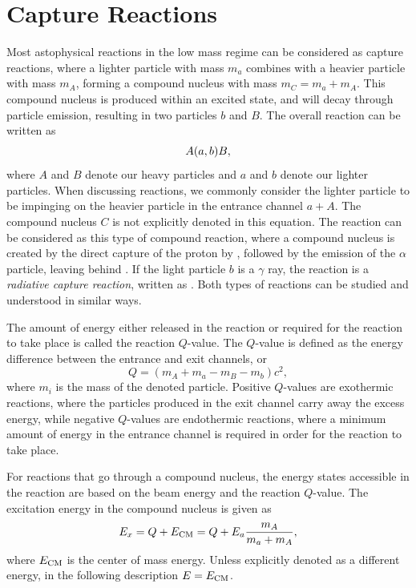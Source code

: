 \section{Capture Reactions}
\label{sec:01-capture-reactions}

Most astophysical reactions in the low mass regime can be considered as
capture reactions, where a lighter particle with mass $m_a$ combines
with a heavier particle with mass $m_A$, forming a compound nucleus with
mass $m_C = m_a + m_A$. This compound nucleus is produced within an
excited state, and will decay through particle emission, resulting in
two particles $b$ and $B$. The overall reaction can be written as
\[
    A(a,b)B,
\]
where $A$ and $B$ denote our heavy particles and $a$ and $b$ denote our
lighter particles. When discussing reactions, we commonly consider the
lighter particle to be impinging on the heavier particle in the entrance
channel $a + A$. The compound nucleus $C$ is not explicitly denoted in
this equation. The reaction \alpa{} can be considered as this type of
compound reaction, where a compound nucleus  is created by
the direct capture of the proton by , followed by the
emission of the $\alpha$ particle, leaving behind . If the
light particle $b$ is a $\gamma$ ray, the reaction is a \emph{radiative
capture reaction}, written as . Both types of
reactions can be studied and understood in similar ways.

The amount of energy either released in the reaction or required for the
reaction to take place is called the reaction $Q$-value. The $Q$-value
is defined as the energy difference between the entrance and exit
channels, or
\[
    Q = (m_A + m_a - m_B - m_b)c^2,
\]
where $m_i$ is the mass of the denoted particle. Positive $Q$-values are
exothermic reactions, where the particles produced in the exit channel
carry away the excess energy, while negative $Q$-values are endothermic
reactions, where a minimum amount of energy in the entrance channel is
required in order for the reaction to take place.

For reactions that go through a compound nucleus, the energy states
accessible in the reaction are based on the beam energy and the reaction
$Q$-value. The excitation energy in the compound nucleus is given as
\[
    E_x = Q + E_{\rm CM} = Q + E_a\frac{m_A}{m_a + m_A},
\]
where $E_{\rm CM}$ is the center of mass energy. Unless explicitly
denoted as a different energy, in the following description
$E = E_{\rm CM}$.



